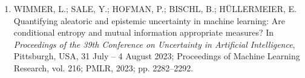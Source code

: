 \documentclass[12pt,a4paper]{article}
\begin{document}
{\begin{enumerate}[label=\arabic*.,leftmargin=1cm,labelsep=0.25cm,itemsep=0pt,parsep=0pt,topsep=2pt,align=left]
\item WIMMER, L.; SALE, Y.; HOFMAN, P.; BISCHL, B.; HÜLLERMEIER, E. Quantifying aleatoric and epistemic uncertainty in machine learning: Are conditional entropy and mutual information appropriate measures? In \textit{Proceedings of the 39th Conference on Uncertainty in Artificial Intelligence}, Pittsburgh, USA, 31 July – 4 August 2023; Proceedings of Machine Learning Research, vol. 216; PMLR, 2023; pp. 2282–2292.
\end{enumerate}\par}
\end{document}
